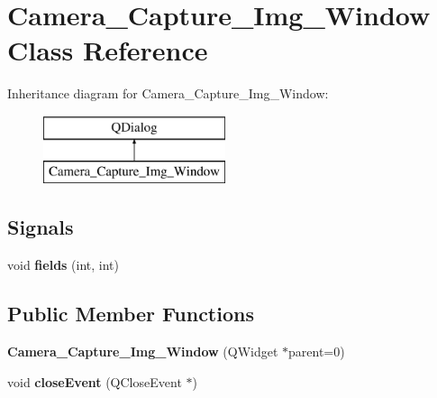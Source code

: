 \hypertarget{class_camera___capture___img___window}{}\section{Camera\+\_\+\+Capture\+\_\+\+Img\+\_\+\+Window Class Reference}
\label{class_camera___capture___img___window}
Inheritance diagram for Camera\+\_\+\+Capture\+\_\+\+Img\+\_\+\+Window\+:\begin{figure}[H]
\begin{center}
\leavevmode
\includegraphics[height=2.000000cm]{class_camera___capture___img___window}
\end{center}
\end{figure}
\subsection*{Signals}
\begin{DoxyCompactItemize}
\item 
void {\bfseries fields} (int, int)\hypertarget{class_camera___capture___img___window_acfd4dea631a3cf2948fec802ceb4f595}{}\label{class_camera___capture___img___window_acfd4dea631a3cf2948fec802ceb4f595}

\end{DoxyCompactItemize}
\subsection*{Public Member Functions}
\begin{DoxyCompactItemize}
\item 
{\bfseries Camera\+\_\+\+Capture\+\_\+\+Img\+\_\+\+Window} (Q\+Widget $\ast$parent=0)\hypertarget{class_camera___capture___img___window_a63bb99e4f3782b80279a7926a9a9cd1b}{}\label{class_camera___capture___img___window_a63bb99e4f3782b80279a7926a9a9cd1b}

\item 
void {\bfseries close\+Event} (Q\+Close\+Event $\ast$)\hypertarget{class_camera___capture___img___window_aa737ef4694501d231be76b701e887a9c}{}\label{class_camera___capture___img___window_aa737ef4694501d231be76b701e887a9c}

\end{DoxyCompactItemize}
